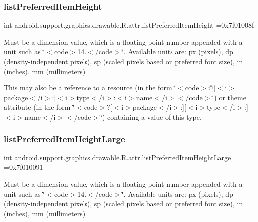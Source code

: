 \subsubsection{\texorpdfstring{list\+Preferred\+Item\+Height}{listPreferredItemHeight}}
{\footnotesize\ttfamily int android.\+support.\+graphics.\+drawable.\+R.\+attr.\+list\+Preferred\+Item\+Height =0x7f01008f\hspace{0.3cm}{\ttfamily [static]}}

Must be a dimension value, which is a floating point number appended with a unit such as \char`\"{}$<$code$>$14.\+5sp$<$/code$>$\char`\"{}. Available units are\+: px (pixels), dp (density-\/independent pixels), sp (scaled pixels based on preferred font size), in (inches), mm (millimeters). 

This may also be a reference to a resource (in the form \char`\"{}$<$code$>$@\mbox{[}$<$i$>$package$<$/i$>$\+:\mbox{]}$<$i$>$type$<$/i$>$\+:$<$i$>$name$<$/i$>$$<$/code$>$\char`\"{}) or theme attribute (in the form \char`\"{}$<$code$>$?\mbox{[}$<$i$>$package$<$/i$>$\+:\mbox{]}\mbox{[}$<$i$>$type$<$/i$>$\+:\mbox{]}$<$i$>$name$<$/i$>$$<$/code$>$\char`\"{}) containing a value of this type. \mbox{\label{classandroid_1_1support_1_1graphics_1_1drawable_1_1R_1_1attr_a20b74adeb5bcb1e8de72ece6d879f44d}} 
\subsubsection{\texorpdfstring{list\+Preferred\+Item\+Height\+Large}{listPreferredItemHeightLarge}}
{\footnotesize\ttfamily int android.\+support.\+graphics.\+drawable.\+R.\+attr.\+list\+Preferred\+Item\+Height\+Large =0x7f010091\hspace{0.3cm}{\ttfamily [static]}}

Must be a dimension value, which is a floating point number appended with a unit such as \char`\"{}$<$code$>$14.\+5sp$<$/code$>$\char`\"{}. Available units are\+: px (pixels), dp (density-\/independent pixels), sp (scaled pixels based on preferred font size), in (inches), mm (millimeters). 

